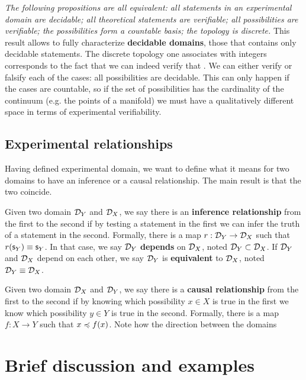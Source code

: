 \documentclass[twocolumn]{article}
\begin{document}
\textit{The following propositions are all equivalent: all statements in an experimental domain are decidable; all theoretical statements are verifiable; all possibilities are verifiable; the possibilities form a countable basis; the topology is discrete.} This result allows to fully characterize \textbf{decidable domains}, those that contains only decidable statements. The discrete topology one associates with integers corresponds to the fact that we can indeed verify that . We can either verify or falsify each of the cases: all possibilities are decidable. This can only happen if the cases are countable, so if the set of possibilities has the cardinality of the continuum (e.g. the points of a manifold) we must have a qualitatively different space in terms of experimental verifiability.

\subsection{Experimental relationships}

Having defined experimental domain, we want to define what it means for two domains to have an inference or a causal relationship. The main result is that the two coincide.

Given two domain $\mathcal{D}_Y$ and $\mathcal{D}_X$, we say there is an \textbf{inference relationship} from the first to the second if by testing a statement in the first we can infer the truth of a statement in the second. Formally, there is a map $r : \mathcal{D}_Y \to \mathcal{D}_X$ such that $r(\mathsf{s}_Y) \equiv \mathsf{s}_Y$. In that case, we say $\mathcal{D}_Y$ \textbf{depends} on $\mathcal{D}_X$, noted $\mathcal{D}_Y \subset \mathcal{D}_X$. If $\mathcal{D}_Y$ and $\mathcal{D}_X$ depend on each other, we say  $\mathcal{D}_Y$ is \textbf{equivalent} to $\mathcal{D}_X$, noted $\mathcal{D}_Y \equiv \mathcal{D}_X$.

Given two domain $\mathcal{D}_X$ and $\mathcal{D}_Y$, we say there is a \textbf{causal relationship} from the first to the second if by knowing which possibility $x \in X$ is true in the first we know which possibility $y \in Y$ is true in the second. Formally, there is a map $f : X \to Y$ such that $x \preccurlyeq f(x)$. Note how the direction between the domains

\section{Brief discussion and examples}
\end{document}
